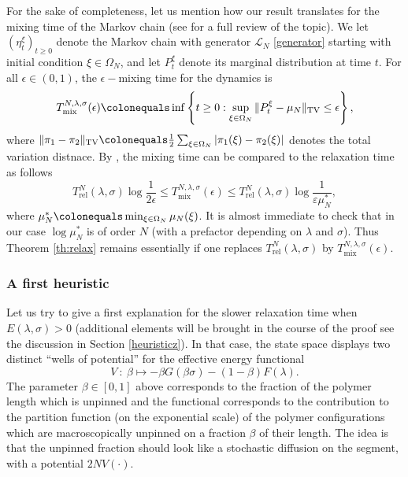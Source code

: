 \documentclass[reqno,11pt]{amsart}
\numberwithin{equation}{section}
\newcommand{\gep}{\varepsilon}       %
\newcommand{\gO}{\Omega}
\newcommand{\gl}{\lambda}
\newcommand{\gs}{\sigma}
\newcommand{\cL}{{\ensuremath{\mathcal L}} }
\newcommand{\Rel}{\mathrm{rel}}
\newcommand{\TV}{\mathrm{TV}}
\newcommand{\Mix}{\mathrm{mix}}
\begin{document}
For the sake of completeness, let us mention how our result translates for the 
mixing time of the Markov chain (see \cite{LPWMCMT} for a full review of the topic).
We let $(\eta_t^{\xi})_{t\ge 0}$ denote the Markov chain with generator $\cL_N$ \eqref{generator} starting with initial condition $\xi \in \gO_N$, and let $P_t^{\xi}$ denote its marginal distribution at time $t$. 
For all $\epsilon \in (0, 1)$, the $\epsilon-$mixing time for the dynamics is
\begin{equation}
T^{N,\gl,\sigma}_{\Mix}(\epsilon) \colonequals \inf \left \{t\geq 0: \sup_{\xi \in \gO_N} \Vert P_t^{\xi}-\mu_N \Vert_{\TV}\leq \epsilon \right\},
\end{equation}
where
$\Vert \pi_1-\pi_2 \Vert_{\TV} \colonequals \frac{1}{2} \sum_{\xi \in \gO_N} \vert \pi_1(\xi)-\pi_2(\xi)\vert$ denotes the total variation distnace.
By \cite[Lemma 20.11, Theorem 12.3]{LPWMCMT}, the mixing time can be compared to the relaxation time as follows
\begin{equation}\label{gapmixtime}
 T_{\Rel}^N(\gl, \gs) \log \frac{1}{2\epsilon} \le T^{N,\gl,\sigma}_{\Mix}(\epsilon) \le  T_{\Rel}^N(\gl, \gs) \log \frac{1}{\gep \mu_N^*},
\end{equation}
where $ \mu_N^* \colonequals \min_{\xi \in \gO_N} \mu_N(\xi)$.
It is almost immediate to check that in our case $\log \mu_N^*$ is of order $N$ (with a prefactor depending on $\gl$ and $\sigma$). Thus Theorem \ref{th:relax} remains essentially if one replaces  $T_{\Rel}^N(\gl, \gs)$ by $T^{N,\gl,\sigma}_{\Mix}(\epsilon)$.





\subsubsection*{A first heuristic}

Let us try to give a first explanation for the slower relaxation time when $E(\gl,\sigma)>0$ (additional elements will be brought in the course of the proof see the discussion in Section \ref{heuristicz}). In that case, the state space 
displays two distinct ``wells of potential'' for the effective  energy functional
$$V \ : \ \beta \mapsto -\beta G(\beta \sigma)-(1-\beta )F(\lambda).$$
The parameter $\beta\in[0,1]$ above corresponds to the fraction of the polymer length which is unpinned and the functional corresponds to the contribution to the partition function (on the exponential scale) of the polymer configurations which are macroscopically unpinned on a fraction $\beta$ of their length.
The idea is that the unpinned fraction should look like a stochastic diffusion on the segment, with a potential  $2N V(\cdot)$.
\end{document}
